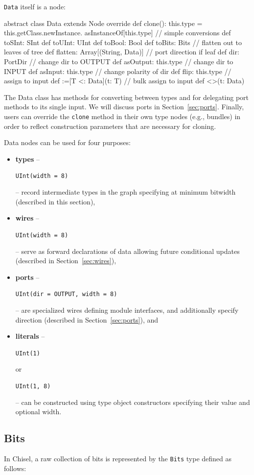 \documentclass[10pt,twocolumn]{article}
\newcommand{\kode}[1]{\begin{footnotesize}{\tt #1}\end{footnotesize}}
\def\code#1{{\small\tt #1}}
\begin{document}
\code{Data} itself is a node:
\begin{scala}
abstract class Data extends Node {
  override def clone(): this.type =
    this.getClass.newInstance.
      asInstanceOf[this.type]
  // simple conversions
  def toSInt: SInt
  def toUInt: UInt
  def toBool: Bool
  def toBits: Bits
  // flatten out to leaves of tree
  def flatten: Array[(String, Data)]
  // port direction if leaf
  def dir: PortDir
  // change dir to OUTPUT
  def asOutput: this.type
  // change dir to INPUT
  def asInput: this.type
  // change polarity of dir
  def flip: this.type
  // assign to input
  def :=[T <: Data](t: T)
  // bulk assign to input
  def <>(t: Data)
}
\end{scala}
\noindent
The Data class has methods for converting between types and for
delegating port methods to its single input.  We will discuss ports in
Section~\ref{sec:ports}.  Finally, users can override the \code{clone}
method in their own type nodes (e.g., bundles) in order to reflect
construction parameters that are necessary for cloning.

Data nodes can be used for four purposes:

\begin{itemize}
\item {\bf types} -- \kode{UInt(width = 8)} -- record intermediate types in the graph
  specifying at minimum bitwidth (described in this section), 
\item {\bf wires} -- \kode{UInt(width = 8)} -- serve as forward declarations of data allowing future
  conditional updates (described in Section~\ref{sec:wires}), 
\item {\bf ports} -- \kode{UInt(dir = OUTPUT, width = 8)} -- are
  specialized wires defining module interfaces, and
  additionally specify direction (described in
  Section~\ref{sec:ports}), and
\item{\bf literals} -- \kode{UInt(1)} or \kode{UInt(1, 8)} -- can be constructed using type object
constructors specifying their value and optional width.
\end{itemize}

\subsection{Bits}

In Chisel, a raw collection of bits is represented by the \code{Bits}
type defined as follows:
\end{document}
